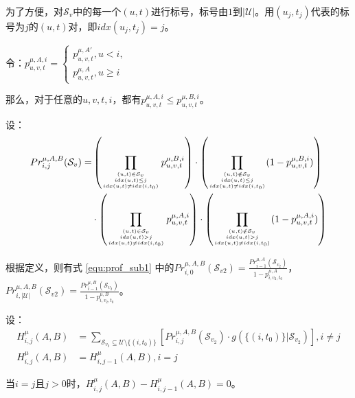 为了方便，对$\mathcal{S}_v$中的每一个$(u,t)$进行标号，标号由$1$到$|\mathcal{U}|。$用$(u_j,t_j)$代表的标号为$j$的$(u,t)$对，即$idx(u_j,t_j)=j$。

令：$p_{u,v,t}^{\mu,A,i}=\begin{cases}p_{u,v,t}^{\mu,A'}, u<i,\\p_{u,v,t}^{\mu,A},u\ge i \end{cases}$

那么，对于任意的$u,v,t,i$，都有$p_{u,v,t}^{\mu,A,i} \le p_{u,v,t}^{\mu,B,i}$。

设：
\begin{align}
\footnotesize
    Pr_{i,j}^{\mu,A,B}(\mathcal{S}_v)=&\left(\prod_{{(u,t)\in \mathcal{S}_v \atop idx(u,t)\le j } \atop{ idx(u,t) \ne idx(i,t_0)}}p_{u,v,t}^{\mu,B,i}\right)\cdot \left(\prod_{{(u,t) \notin \mathcal{S}_v \atop idx(u,t)\le j} \atop{ idx(u,t) \ne idx(i,t_0)}} (1-p_{u,v,t}^{\mu,B,i})\right) \nonumber \\
    &\cdot \left(\prod_{{(u,t)\in \mathcal{S}_v \atop idx(u,t)> j} \atop {idx(u,t)\ne idx(i,t_0)}}p_{u,v,t}^{\mu,A,i}\right)\cdot \left(\prod_{{(u,t) \notin \mathcal{S}_v \atop idx(u,t)> j} \atop{ idx(u,t)\ne idx(i,t_0)}} (1-p_{u,v,t}^{\mu,A,i})\right)
\end{align}

根据定义，则有式 \ref{equ:prof_sub1} 中的$Pr_{i,0}^{\mu,A,B}(\mathcal{S}_{v2})=\frac{Pr_{i-1}^{\mu,A}(\mathcal{S}_{v_2})}{1-p_{i,v_2,t_0}^{\mu,A}}$，$Pr_{i,|\mathcal{U}|}^{\mu,A,B}(\mathcal{S}_{v2})=\frac{Pr_{i-1}^{\mu,B}(\mathcal{S}_{v_2})}{1-p_{i,v_2,t_0}^{\mu,B}}$。

设：
\begin{align}
    H_{i,j}^{\mu}(A,B)&= \sum_{\mathcal{S}_{v_2}\subseteq \mathcal{U} \setminus \{(i,t_0)\}}\left[Pr_{i,j}^{\mu,A,B}(\mathcal{S}_{v_2}) \cdot g(\{(i,t_0)\} |\mathcal{S}_{v_2})\right],i\ne j 
    \\H_{i,j}^{\mu}(A,B)&=H_{i,j-1}^{\mu}(A,B),i=j
\end{align}

当$i=j$且$j>0$时，$H_{i,j}^{\mu}(A,B)-H_{i,j-1}^{\mu}(A,B)=0$。

